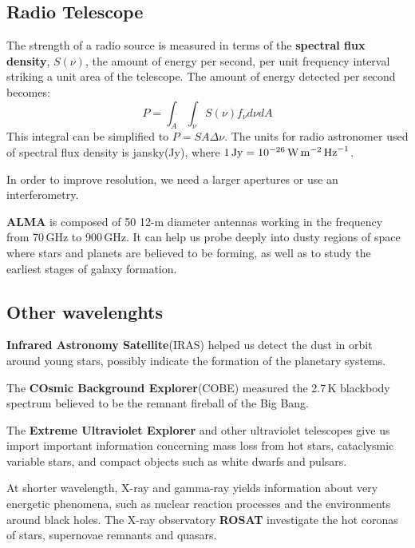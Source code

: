 \documentclass{article}
\numberwithin{equation}{section}
\numberwithin{figure}{section}
\begin{document}
	\subsection{Radio Telescope}
	The strength of a radio source is measured in terms of the {\bf spectral flux density}, $S(\nu)$, the amount of energy per second, per unit frequency interval striking a unit area of the telescope. The amount of energy detected per second becomes:
	\begin{equation}
		P = \int_A\int_\nu S(\nu)f_\nu d\nu dA
	\end{equation}
	This integral can be simplified to $P = SA\Delta \nu$. The units for radio astronomer used of spectral flux density is jansky(Jy), where $1\,{\rm Jy} = 10^{-26}\,{\rm W}\,{\rm m}^{-2}\,{\rm Hz}^{-1}$.
	
	In order to improve resolution, we need a larger apertures or use an interferometry.
	
	{\bf ALMA} is composed of 50 12-m diameter antennas working in the frequency from 70\,GHz to 900\,GHz. It can help us probe deeply into dusty regions of space where stars and planets are believed to be forming, as well as to study the earliest stages of galaxy formation.
	
	\subsection{Other wavelenghts}
	{\bf Infrared Astronomy Satellite}(IRAS) helped us detect the dust in orbit around young stars, possibly indicate the formation of the planetary systems. 
	
	The {\bf COsmic Background Explorer}(COBE) measured the 2.7\,K blackbody spectrum believed to be the remnant fireball of the Big Bang. 
	
	The {\bf Extreme Ultraviolet Explorer} and other ultraviolet telescopes give us import important information concerning mass loss from hot stars, cataclysmic variable stars, and compact objects such as white dwarfs and pulsars. 
	
	At shorter wavelength, X-ray and gamma-ray yields information about very energetic phenomena, such as nuclear reaction processes and the environments around black holes. The X-ray observatory {\bf ROSAT} investigate the hot coronas of stars, supernovae remnants and quasars.
	
\end{document}
